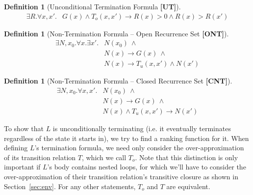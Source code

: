\documentclass[preprint]{sigplanconf}
\theoremstyle{definition}
\newtheorem{definition}[theorem]{Definition}
\begin{document}
\begin{figure*}
\begin{framed}
\begin{definition}[Unconditional Termination Formula {\bf [UT]}]
\label{def:UT}
\begin{align*}
 \exists R . \forall x, x' . & G(x) \wedge T_o(x, x') \rightarrow R(x) > 0 \wedge R(x) > R(x')
\end{align*}
\end{definition}

\begin{definition}[Non-Termination Formula -- Open Recurrence Set  {\bf [ONT]}]
\label{def:ont}
 \begin{align*}
  \exists N, x_0 . \forall x . \exists x' . & N(x_0) ~\wedge \\ &  N(x) \rightarrow G(x) ~ \wedge \\
							& N(x) \rightarrow T_u(x, x') \wedge N(x') 
 \end{align*}
\end{definition}

\begin{definition}[Non-Termination Formula -- Closed Recurrence Set {\bf [CNT]}]
\label{def:cnt}
 \begin{align*}
  \exists N, x_0 . \forall x, x' . & N(x_0) ~ \wedge \\ & N(x) \rightarrow G(x) ~ \wedge \\
							& N(x) \wedge T_u(x, x') \rightarrow N(x') 
 \end{align*}
\end{definition}


\end{framed}
\end{figure*}



To show that $L$ is unconditionally terminating (i.e. it eventually terminates regardless of the
state it starts in), we try to find a ranking function for it. When defining $L$'s termination 
formula, we need only consider the over-approximation of its transition relation $T$, which we call $T_o$.
Note that this distinction is only important if $L$'s body contains nested loops, for which we'll have to 
consider the over-approximation of their transition relation's transitive closure
as shown in Section~\ref{sec:env}. For any other statements, $T_o$ and $T$ are equivalent.
\end{document}
